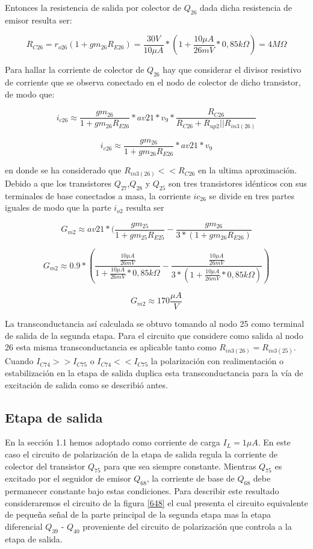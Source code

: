 \documentclass[12pt,a4paper,final,headinclude,footinclude,BCOR5mm]{scrartcl}
\begin{document}
Entonces la resistencia de salida por colector de $Q_{26}$ dada dicha resistencia de emisor resulta ser:

$$R_{C26} = r_{o26} (1 + gm_{26} R_{E26}) = \frac{30 V}{10 \mu A} * (1 + \frac{10 \mu A}{26 mV}*0,85 k\Omega) = 4 M\Omega$$

Para hallar la corriente de colector de $Q_{26}$ hay que considerar el divisor resistivo de corriente que se observa conectado en el nodo de colector de dicho transistor, de modo que:

$$i_{c26} \approx \frac{gm_{26}}{1 + gm_{26}R_{E26}} * av21*v_{9} * \frac{R_{C26}}{R_{C26} + R_{up2}||R_{in3(26)}}$$

$$i_{c26} \approx \frac{gm_{26}}{1 + gm_{26}R_{E26}} * av21*v_{9}$$

en donde se ha considerado que $R_{in3(26)} << R_{C26}$ en la ultima aproximación.\\

Debido a que los transistores $Q_{27}$,$Q_{28}$ y $Q_{25}$ son tres transistores idénticos con sus terminales de base conectados a masa, la corriente $ic_{26}$ se divide en tres partes iguales de modo que la parte $i_{o2}$ resulta ser

$$G_{m2} \approx av21 * (\frac{gm_{25}}{1 + gm_{25}R_{E25}} - \frac{gm_{26}}{3*(1 + gm_{26}R_{E26})}$$

$$G_{m2} \approx 0.9 * (\frac{\frac{10 \mu A}{26 mV}}{1 + \frac{10 \mu A}{26 mV}*0,85 k\Omega} - \frac{\frac{10 \mu A}{26 mV}}{3*(1 + \frac{10 \mu A}{26 mV}*0,85 k\Omega)})$$

$$G_{m2} \approx 170 \frac{\mu A}{V}$$

La transconductancia así calculada se obtuvo tomando al nodo 25 como terminal de salida de la segunda etapa. Para el circuito que considere como salida al nodo 26 esta misma transconductancia es aplicable tanto como $R_{in3(26)} = R_{in3(25)}$. Cuando $I_{C74} >> I_{C75}$ o $I_{C74} << I_{C75}$ la polarización con realimentación o estabilización en la etapa de salida duplica esta transconductancia para la vía de excitación de salida como se describió antes.


\subsection{Etapa de salida}

En la sección 1.1 hemos adoptado como corriente de carga $I_{L} = 1 \mu A$. En este caso el circuito de polarización de la etapa de salida regula la corriente de colector del transistor $Q_{75}$ para que sea siempre constante. Mientras $Q_{75}$ es excitado por el seguidor de emisor $Q_{68}$, la corriente de base de $Q_{68}$ debe permanecer constante bajo estas condiciones. Para describir este resultado consideraremos el circuito de la figura \ref{648} el cual presenta el circuito equivalente de pequeña señal de la parte principal de la segunda etapa mas la etapa diferencial $Q_{39}$ - $Q_{40}$ proveniente del circuito de polarización que controla a la etapa de salida.
\end{document}
